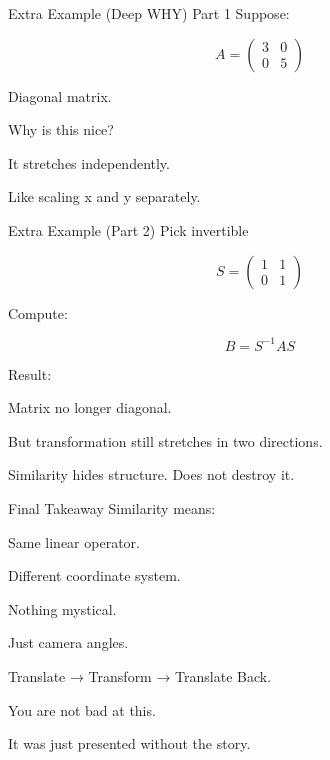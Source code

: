 \documentclass[landscape]{beamer}
\begin{document}
\begin{frame}{Extra Example (Deep WHY) Part 1}
Suppose:

\[
A=
\begin{pmatrix}
3&0\\
0&5
\end{pmatrix}
\]

Diagonal matrix.

Why is this nice?

It stretches independently.

Like scaling x and y separately.
\end{frame}

\begin{frame}{Extra Example (Part 2)}
Pick invertible

\[
S=
\begin{pmatrix}
1&1\\
0&1
\end{pmatrix}
\]

Compute:

\[
B=S^{-1}AS
\]

Result:

Matrix no longer diagonal.

But transformation
still stretches in two directions.

Similarity hides structure.
Does not destroy it.
\end{frame}

\begin{frame}{Final Takeaway}
Similarity means:

Same linear operator.

Different coordinate system.

Nothing mystical.

Just camera angles.

Translate → Transform → Translate Back.

You are not bad at this.

It was just presented without the story.
\end{frame}
\end{document}
